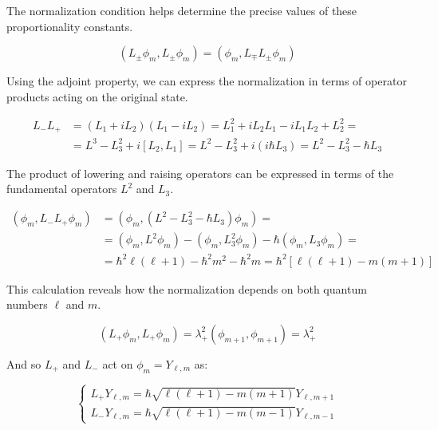 \documentclass[italian]{HKNdocument}
\begin{document}
The normalization condition helps determine the precise values of these proportionality constants.

\begin{equation}
\left(L_{ \pm} \phi_{m}, L_{ \pm} \phi_{m}\right)=\left(\phi_{m}, L_{\mp} L_{ \pm} \phi_{m}\right) \label{eq:8.18}
\end{equation}

Using the adjoint property, we can express the normalization in terms of operator products acting on the original state.

\begin{align}
L_{-} L_{+} & =\left(L_{1}+i L_{2}\right)\left(L_{1}-i L_{2}\right)=L_{1}^{2}+i L_{2} L_{1}-i L_{1} L_{2}+L_{2}^{2}= \\
& =L^{3}-L_{3}^{2}+i\left[L_{2}, L_{1}\right]=L^{2}-L_{3}^{2}+i\left(i \hbar L_{3}\right)=L^{2}-L_{3}^{2}-\hbar L_{3} \label{eq:8.19}
\end{align}

The product of lowering and raising operators can be expressed in terms of the fundamental operators $L^2$ and $L_3$.

\begin{align}
\left(\phi_{m}, L_{-} L_{+} \phi_{m}\right) & =\left(\phi_{m},\left(L^{2}-L_{3}^{2}-\hbar L_{3}\right) \phi_{m}\right)= \\
& =\left(\phi_{m}, L^{2} \phi_{m}\right)-\left(\phi_{m}, L_{3}^{2} \phi_{m}\right)-\hbar\left(\phi_{m}, L_{3} \phi_{m}\right)=  \label{eq:8.20}\\
& =\hbar^{2} \ell(\ell+1)-\hbar^{2} m^{2}-\hbar^{2} m=\hbar^{2}[\ell(\ell+1)-m(m+1)]
\end{align}

This calculation reveals how the normalization depends on both quantum numbers $\ell$ and $m$.

\begin{equation}
\left(L_{+} \phi_{m}, L_{+} \phi_{m}\right)=\lambda_{+}^{2}\left(\phi_{m+1}, \phi_{m+1}\right)=\lambda_{+}^{2} \label{eq:8.21}
\end{equation}

And so $L_{+}$ and $L_{-}$ act on $\phi_{m}=Y_{\ell, m}$ as:

\[
\left\{\begin{array}{l}
L_{+} Y_{\ell, m}=\hbar \sqrt{\ell(\ell+1)-m(m+1)} Y_{\ell, m+1}  \label{eq:8.22}\\
L_{-} Y_{\ell, m}=\hbar \sqrt{\ell(\ell+1)-m(m-1)} Y_{\ell, m-1}
\end{array}\right.
\]
\end{document}
